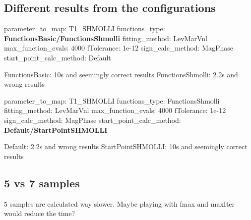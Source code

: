 \subsection*{Different results from the configurations}

parameter\-\_\-to\-\_\-map\-: T1\-\_\-\-S\-H\-M\-O\-L\-L\-I functions\-\_\-type\-: {\bfseries Functions\-Basic/\-Functions\-Shmolli} fitting\-\_\-method\-: Lev\-Mar\-Vnl max\-\_\-function\-\_\-evals\-: 4000 f\-Tolerance\-: 1e-\/12 sign\-\_\-calc\-\_\-method\-: Mag\-Phase start\-\_\-point\-\_\-calc\-\_\-method\-: Default

Functions\-Basic\-: 10s and seemingly correct results Functions\-Shmolli\-: 2.\-2s and wrong results

parameter\-\_\-to\-\_\-map\-: T1\-\_\-\-S\-H\-M\-O\-L\-L\-I functions\-\_\-type\-: Functions\-Shmolli fitting\-\_\-method\-: Lev\-Mar\-Vnl max\-\_\-function\-\_\-evals\-: 4000 f\-Tolerance\-: 1e-\/12 sign\-\_\-calc\-\_\-method\-: Mag\-Phase start\-\_\-point\-\_\-calc\-\_\-method\-: {\bfseries Default/\-Start\-Point\-S\-H\-M\-O\-L\-L\-I}

Default\-: 2.\-2s and wrong results Start\-Point\-S\-H\-M\-O\-L\-L\-I\-: 10s and seemingly correct results

\subsection*{5 vs 7 samples}

5 samples are calculated way slower. Maybe playing with fmax and max\-Iter would reduce the time? 